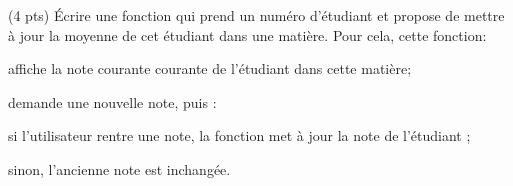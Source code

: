 \question (4 pts) {\'E}crire une fonction  qui prend un num{\'e}ro
  d'{\'e}tudiant et propose de mettre {\`a} jour la moyenne de cet {\'e}tudiant
  dans une mati{\`e}re. Pour cela, cette fonction:
  \begin{flist}
  \item affiche la note courante courante de l'{\'e}tudiant dans cette
    mati{\`e}re;
  \item demande une nouvelle note, puis :
    \begin{flist}
    \item si l'utilisateur rentre une note, la fonction met {\`a} jour la
      note de l'{\'e}tudiant ;
    \item sinon, l'ancienne note est inchang{\'e}e.
    \end{flist}
  \end{flist}

